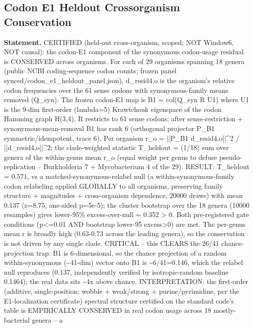 \subsection{Codon E1 Heldout Crossorganism Conservation}\label{sec:bridge-codon-e1-heldout-crossorganism-conservation}
\textbf{Statement.} CERTIFIED (held-out cross-organism, scoped; NOT Window6, NOT causal): the codon-E1 component of the
synonymous codon-usage residual is CONSERVED across organisms. For each of 29 organisms spanning 18
genera (public NCBI coding-sequence codon counts; frozen panel
synced/codon\_e1\_heldout\_panel.json), d\_resid4,o is the organism's relative codon frequencies
over the 61 sense codons with synonymous-family means removed (Q\_syn). The frozen codon-E1 map is
B1 = col(Q\_syn R U1) where U1 is the 9-dim first-order (lambda=5) Krawtchouk eigenspace of the
codon Hamming graph H(3,4), R restricts to 61 sense codons; after sense-restriction +
synonymous-mean-removal B1 has rank 6 (orthogonal projector P\_B1 symmetric/idempotent, trace 6).
Per organism r\_o = ||P\_B1 d\_resid4,o||\textasciicircum{}2 / ||d\_resid4,o||\textasciicircum{}2;
the clade-weighted statistic T\_heldout = (1/18) sum over genera of the within-genus mean r\_o
(equal weight per genus to defuse pseudo-replication -- Burkholderia 7 + Mycobacterium 4 of the 29).
RESULT: T\_heldout = 0.571, vs a matched-synonymous-relabel null (a within-synonymous-family codon
relabeling applied GLOBALLY to all organisms, preserving family structure + magnitudes +
cross-organism dependence, 20000 draws) with mean 0.137 (z=8.75, one-sided p=5e-5); the cluster
bootstrap over the 18 genera (10000 resamples) gives lower-95\% excess-over-null = 0.352 > 0. Both
pre-registered gate conditions (p<=0.01 AND bootstrap lower-95 excess>0) are met. The per-genus mean
r is broadly high (0.63-0.73 across the leading genera), so the conservation is not driven by any
single clade. CRITICAL -- this CLEARS the 26/41 chance-projection trap: B1 is 6-dimensional, so the
chance projection of a random within-synonymous (\textasciitilde{}41-dim) vector onto B1 is
\textasciitilde{}6/41=0.146, which the relabel null reproduces (0.137, independently verified by
isotropic-random baseline 0.1464); the real data sits \textasciitilde{}4x above chance.
INTERPRETATION: the first-order (additive, single-position; wobble + weak/strong +
purine/pyrimidine, per the E1-localization certificate) spectral structure certified on the standard
code's table is EMPIRICALLY CONSERVED in real codon usage across 18 mostly-bacterial genera -- a
